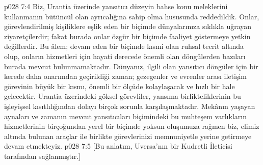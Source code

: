 \vs p028 7:4 Biz, Urantia üzerinde yansıtıcı düzeyin bahse konu meleklerini kullanmanın bütüncül olan ayrıcalığına sahip olma hususunda reddedildik. Onlar, görevlendirilmiş kişiliklere eşlik eden bir biçimde dünyalarınıza sıklıkla uğrayan ziyaretçilerdir; fakat burada onlar özgür bir biçimde faaliyet göstermeye yetkin değillerdir. Bu âlem; devam eden bir biçimde kısmi olan ruhsal tecrit altında olup, onların hizmetleri için hayati derecede önemli olan döngülerden bazıları burada mevcut bulunmamaktadır. Dünyanız, ilgili olan yansıtıcı döngüler için bir kerede daha onarımdan geçirildiği zaman; gezegenler ve evrenler arası iletişim görevinin büyük bir kısmı, önemli bir ölçüde kolaylaşacak ve hızlı bir hale gelecektir. Urantia üzerindeki göksel görevliler, yansıma birlikteliklerinin bu işleyişsel kısıtlılığından dolayı birçok sorunla karşılaşmaktadır. Mekânın yaşayan aynaları ve zamanın mevcut yansıtıcıları biçimindeki bu muhteşem varlıkların hizmetlerinin birçoğundan yerel bir biçimde yoksun oluşumuza rağmen biz, elimiz altında bulunan araçlar ile birlikte görevlerinizi memnuniyetle yerine getirmeye devam etmekteyiz.
\vs p028 7:5 [Bu anlatım, Uversa’nın bir Kudretli İleticisi tarafından sağlanmıştır.]
